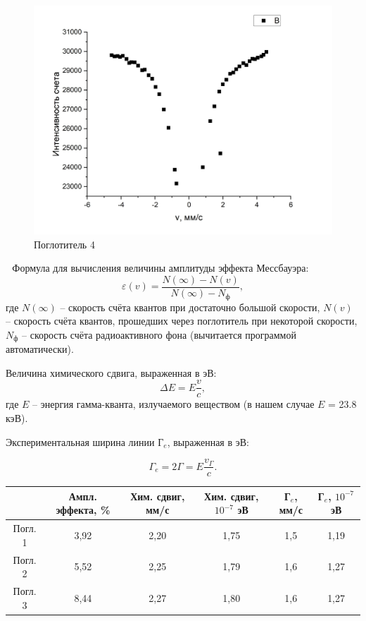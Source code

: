 \documentclass[a4paper, 12pt]{article}
\begin{document}
\begin{figure}[h!]
\begin{center}
\includegraphics[scale=0.5]{7} 
\caption{Поглотитель 4}
\end{center}
\end{figure}

\newpage
$ $
\newpage
$ $
Формула для вычисления величины амплитуды эффекта Мессбауэра:
$$
\varepsilon(v) = \frac{N(\infty) - N(v)}{N(\infty) - N_\text{ф}},
$$
где $N(\infty)$ -- скорость счёта квантов при достаточно большой скорости, $N(v)$ -- скорость счёта квантов, прошедших через поглотитель при некоторой скорости, $N_\text{ф}$ -- скорость счёта радиоактивного фона (вычитается программой автоматически).

Величина химического сдвига, выраженная в эВ:
$$
\Delta E = E \frac{v}{c},
$$
где $E$ -- энергия гамма-кванта, излучаемого веществом (в нашем случае $E$ = 23.8 кэВ).

Экспериментальная ширина линии Г$_e$, выраженная в эВ:

$$
\Gamma_e = 2 \Gamma = E \frac{v_\Gamma}{c}.
$$

\begin{table}[h!]
\begin{tabular}{|c|c|c|c|c|c|}
\hline
              & Ампл. эффекта, \% & Хим. сдвиг, мм/с & Хим. сдвиг, $10^{-7}$ эВ & Г$_e$, мм/с & Г$_e$, $10^{-7}$ эВ \\ \hline
Погл. 1 &      3,92                 &   2,20               &      1,75          &      1,5       &     1,19      \\ \hline
Погл. 2 &      5,52                 &   2,25               &      1,79          &      1,6       &     1,27      \\ \hline
Погл. 3 &      8,44                 &   2,27               &      1,80          &      1,6       &     1,27      \\ \hline
\end{tabular}
\end{table}
\end{document}
